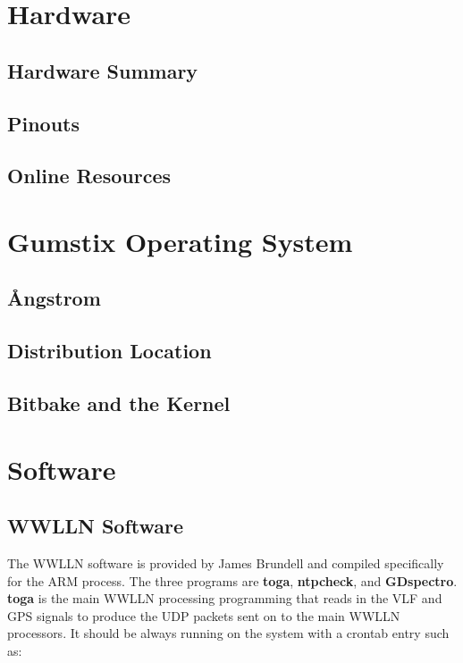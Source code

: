 \section{Hardware}

\subsection{Hardware Summary}

\subsection{Pinouts}

\subsection{Online Resources}

\section{Gumstix Operating System}

\subsection{\r{A}ngstrom}

\subsection{Distribution Location}

\subsection{Bitbake and the Kernel}

\section{Software}

\subsection{WWLLN Software}

The WWLLN software is provided by James Brundell and compiled specifically for the ARM process.
The three programs are {\bf toga}, {\bf ntpcheck}, and {\bf GDspectro}.
{\bf toga} is the main WWLLN processing programming that reads in the VLF and GPS signals to produce the UDP packets sent on to the main WWLLN processors.
It should be always running on the system with a crontab entry such as:

